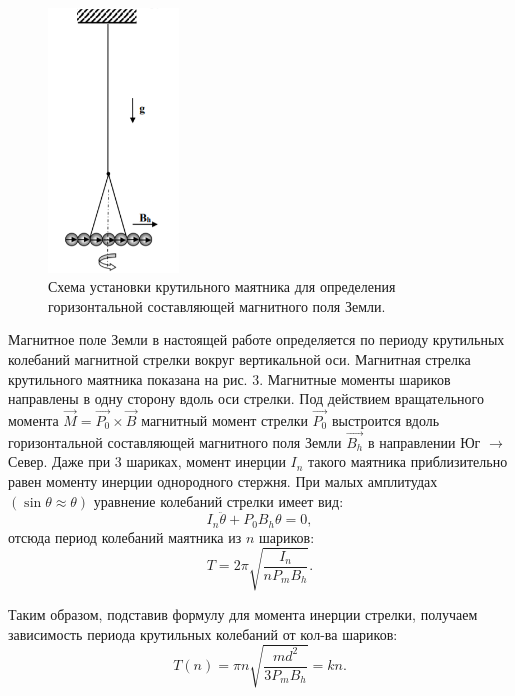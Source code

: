 \documentclass[a4paper, 14pt]{extarticle}%
\newcommand\ECaption[1]{%
     \captionsetup{font=footnotesize}%
     \caption{#1}}
\begin{document}
\begin{figure}
\begin{center}
\includegraphics[height=7cm]{krut.png}
\end{center}
\ECaption{Схема установки крутильного маятника для определения горизонтальной составляющей магнитного поля Земли.}
\end{figure}


Магнитное поле Земли в настоящей работе определяется по периоду крутильных колебаний
магнитной стрелки вокруг вертикальной оси. 
Магнитная стрелка крутильного маятника показана на рис. 3.
 Магнитные моменты шариков направлены в одну
сторону вдоль оси стрелки. Под действием вращательного
момента $\vec{M} = \vec{P_0} \times\vec{B}$ магнитный момент стрелки $\vec{P_0}$ выстроится вдоль горизонтальной составляющей магнитного поля Земли $\vec{B_h}$ в направлении Юг $\longrightarrow$ Север. 
Даже при 3 шариках, момент инерции $I_n$ такого маятника приблизительно равен моменту инерции однородного стержня. При малых амплитудах $(\sin\theta\approx\theta)$ уравнение колебаний стрелки имеет вид:
\[I_n\ddot{\theta} + P_0B_h\theta=0,\]
отсюда период колебаний маятника из $n$ шариков:
\[T = 2\pi\sqrt{\frac{I_n}{nP_mB_h}}.\]

Таким образом, подставив формулу для момента инерции стрелки, получаем  зависимость периода крутильных колебаний от кол-ва шариков:
\begin{equation}
T(n) = \pi n\sqrt{\frac{md^2}{3P_mB_h}} = kn.
\end{equation}
\end{document}
